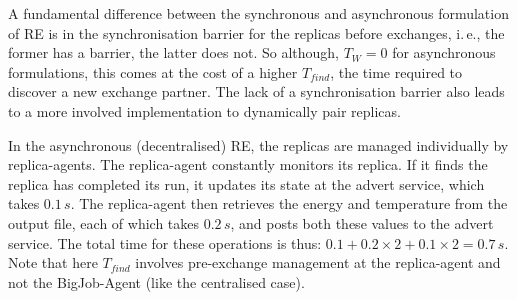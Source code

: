 \documentclass{rspublic}
\newcommand{\alnote}[1]{ {\textcolor{blue} { ***andre: #1 }}}
\newcommand{\athotanote}[1]{ {\textcolor{green} { ***athota: #1 }}}
\newcommand{\alnote}[1]{}
\newcommand{\athotanote}[1]{}
\begin{document}



A fundamental difference between the synchronous and asynchronous
formulation of RE is in the synchronisation barrier for the replicas
before exchanges, i.\,e., the former has a barrier, the latter does not.
So although, $T_W = 0$ for asynchronous formulations, this comes at
the cost of a higher $T_{find}$, the time required to discover a new
exchange partner. The lack of a synchronisation barrier
also leads to a more involved implementation to dynamically pair replicas.

In the asynchronous (decentralised) RE, the replicas are managed
individually by replica-agents. The replica-agent constantly monitors
its replica. If it finds the replica has completed its run, it updates
its state at the advert service, which takes $0.1\,s$.  The
replica-agent then retrieves the energy and temperature from the output
file, each of which takes $0.2\,s$, and posts both these values
to the advert service.  The total time for these operations is
thus: $0.1+0.2\times2+0.1\times2=0.7\,s$. 
Note that here $T_{find}$ involves pre-exchange management at 
the replica-agent and not the BigJob-Agent (like the centralised case).  
\end{document}
